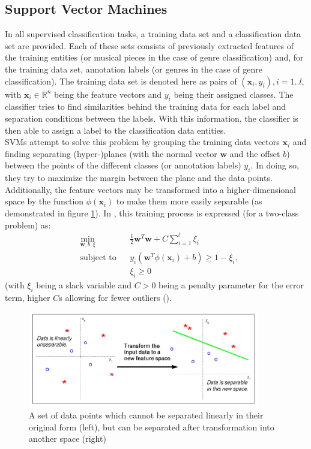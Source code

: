 \subsection{Support Vector Machines}
In all supervised classification tasks, a training data set and a classification data set are provided. Each of these sets consists of previously extracted features of the training entities (or musical pieces in the case of genre classification) and, for the training data set, annotation labels (or genres in the case of genre classification). The training data set is denoted here as pairs of $\left(\mathbf{x}_{i}, y_{i}\right), i=1..l$, with $\textbf{x}_i \in \mathbb{R}^{n}$ being the feature vectors and $y_{i}$ being their assigned classes. The classifier tries to find similarities behind the training data for each label and separation conditions between the labels. With this information, the classifier is then able to assign a label to the classification data entities.\\
SVMs attempt to solve this problem by grouping the training data vectors $\mathbf{x}_{i}$ and finding separating (hyper-)planes (with the normal vector $\mathbf{w}$ and the offset $b$) between the points of the different classes (or annotation labels) $y_{i}$. In doing so, they try to maximize the margin between the plane and the data points. Additionally, the feature vectors may be transformed into a higher-dimensional space by the function $\phi(\textbf{x}_i)$ to make them more easily separable (as demonstrated in figure \ref{fig:svm_transformation}).\newpage
In \cite{techreport:practical_svm}, this training process is expressed (for a two-class problem) as:
\begin{equation*}
\begin{aligned}
& \min\limits_{\mathbf{w},b,\xi} & & \frac{1}{2}\mathbf{w}^{T}\mathbf{w} + C \sum\limits_{i=1}^{l}\xi_{i} \\
& \text{subject to} & & y_{i}(\mathbf{w}^{T} \phi(\mathbf{x}_{i})+b) \geq 1-\xi_{i} , \\
&&& \xi_{i} \geq 0
\end{aligned}
\end{equation*}
(with $\xi_{i}$ being a slack variable and $C > 0$ being a penalty parameter for the error term, higher $C$s allowing for fewer outliers (\cite{article:intro_svm}).
\begin{figure}[htbp]
	\centering
	\includegraphics[width=0.9\textwidth]{images/svm_transformation.png}
	\caption{A set of data points which cannot be separated linearly in their original form (left), but can be separated after transformation into another space (right) \cite{article:intro_svm}}
	\label{fig:svm_transformation}
\end{figure}
